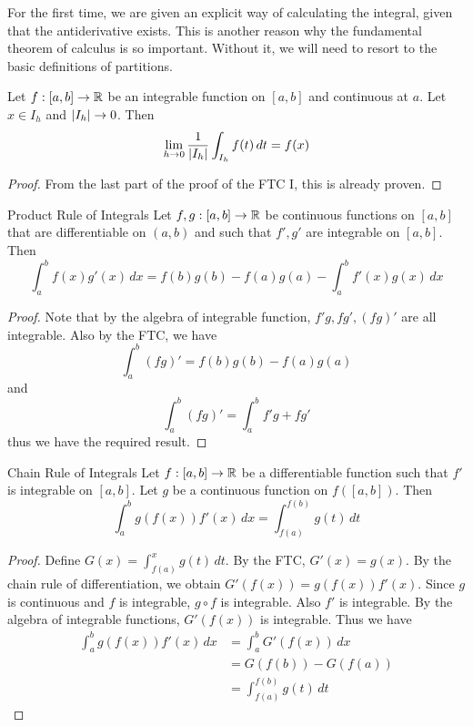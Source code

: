 \documentclass[a4paper]{article}
\begin{document}
For the first time, we are given an explicit way of calculating the integral, given that the antiderivative exists. This is another reason why the fundamental theorem of calculus is so important. Without it, we will need to resort to the basic definitions of partitions. 

\begin{thm}{}{} Let $f:[a,b]\to\mathbb{R}$ be an integrable function on $[a,b]$ and continuous at $a$. Let $x\in I_h$ and $\abs{I_h}\to 0$. Then $$\lim_{h\to 0}\frac{1}{\abs{I_h}}\int_{I_h}f(t)\,dt=f(x)$$ \tcbline
\begin{proof} From the last part of the proof of the FTC I, this is already proven. 
\end{proof}
\end{thm}

\begin{thm}{Product Rule of Integrals}{} Let $f,g:[a,b]\to\mathbb{R}$ be continuous functions on $[a,b]$ that are differentiable on $(a,b)$ and such that $f',g'$ are integrable on $[a,b]$. Then $$\int_{a}^{b}f(x)g'(x)\,dx=f(b)g(b)-f(a)g(a)-\int_{a}^{b}f'(x)g(x)\,dx$$ \tcbline
\begin{proof} Note that by the algebra of integrable function, $f'g,fg',(fg)'$ are all integrable. Also by the FTC, we have $$\int_a^b(fg)'=f(b)g(b)-f(a)g(a)$$ and $$\int_a^b(fg)'=\int_a^bf'g+fg'$$ thus we have the required result. 
\end{proof}
\end{thm}

\begin{thm}{Chain Rule of Integrals}{} Let $f:[a,b]\to\mathbb{R}$ be a differentiable function such that $f'$ is integrable on $[a,b]$. Let $g$ be a continuous function on $f([a,b])$. Then $$\int_{a}^{b}g\left(f(x)\right)f'(x)\,dx=\int_{f(a)}^{f(b)}g(t)\,dt$$ \tcbline
\begin{proof}
Define $G(x)=\int_{f(a)}^xg(t)\,dt$. By the FTC, $G'(x)=g(x)$. By the chain rule of differentiation, we obtain $G'(f(x))=g(f(x))f'(x)$. Since $g$ is continuous and $f$ is integrable, $g\circ f$ is integrable. Also $f'$ is integrable. By the algebra of integrable functions, $G'(f(x))$ is integrable. Thus we have
\begin{align*}
\int_a^bg(f(x))f'(x)\,dx&=\int_a^bG'(f(x))\,dx\\
&=G(f(b))-G(f(a))\tag{FTC}\\
&=\int_{f(a)}^{f(b)}g(t)\,dt\tag{FTC}
\end{align*}
\end{proof}
\end{thm}
\end{document}
